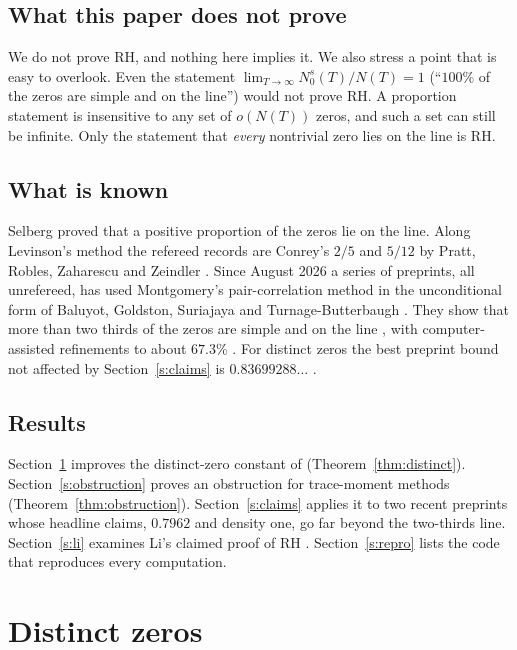 \documentclass[reqno,11pt]{amsart}
\numberwithin{equation}{section}
\theoremstyle{plain}
\theoremstyle{remark}
\begin{document}
\subsection*{What this paper does not prove}
We do not prove RH, and nothing here implies it. We also stress a point that
is easy to overlook. Even the statement $\lim_{T\to\infty}N_0^{s}(T)/N(T)=1$
(``$100\%$ of the zeros are simple and on the line'') would not prove RH. A
proportion statement is insensitive to any set of $o(N(T))$ zeros, and such a
set can still be infinite. Only the statement that \emph{every} nontrivial zero
lies on the line is RH.

\subsection*{What is known}
Selberg \cite{Sel42} proved that a positive proportion of the zeros lie on the
line. Along Levinson's method \cite{Lev74} the refereed records are
Conrey's $2/5$ \cite{Con89} and $5/12$ by Pratt, Robles, Zaharescu and
Zeindler \cite{PRZZ}. Since August 2026 a series of preprints, all
unrefereed, has used Montgomery's pair-correlation method \cite{Mon73} in the
unconditional form of Baluyot, Goldston, Suriajaya and Turnage-Butterbaugh
\cite{BGST24}. They show that more than two thirds of the zeros are simple and on
the line \cite{C26,AF26,Lam26,Wan26}, with computer-assisted refinements to about
$67.3\%$ \cite{TG26,TRM26}. For distinct zeros the best preprint bound not affected by
Section~\ref{s:claims} is $0.83699288\ldots$ \cite{Kna26}.

\subsection*{Results}
Section~\ref{s:distinct} improves the distinct-zero constant of \cite{Kna26}
(Theorem~\ref{thm:distinct}). Section~\ref{s:obstruction} proves an obstruction
for trace-moment methods (Theorem~\ref{thm:obstruction}). Section~\ref{s:claims}
applies it to two recent preprints \cite{YY26a,YY26b} whose headline claims,
$0.7962$ and density one, go far beyond the two-thirds line. Section~\ref{s:li}
examines Li's claimed proof of RH \cite{Li08}. Section~\ref{s:repro} lists the
code that reproduces every computation.

\section{Distinct zeros}\label{s:distinct}
\end{document}
